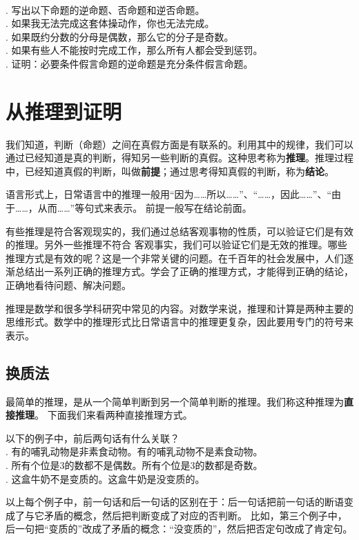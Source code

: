 \begin{xt}\label{xt:2-2-1}
    \mbox{} \\
    . 写出以下命题的逆命题、否命题和逆否命题。\\
    .  如果我无法完成这套体操动作，你也无法完成。\\
    . 如果既约分数的分母是偶数，那么它的分子是奇数。\\
    . 如果有些人不能按时完成工作，那么所有人都会受到惩罚。\\
    . 证明：必要条件假言命题的逆命题是充分条件假言命题。
\end{xt}

\chapter{从推理到证明}  %

我们知道，判断（命题）之间在真假方面是有联系的。利用其中的规律，我们可以通过已经知道是真的判断，得知另一些判断的真假。这种思考称为\textbf{推理}。推理过程中，已经知道真假的判断，叫做\textbf{前提}；通过思考得知真假的判断，称为\textbf{结论}。

语言形式上，日常语言中的推理一般用“因为……所以……”、“……，因此……”、“由于……，从而……”等句式来表示。
前提一般写在结论前面。

有些推理是符合客观现实的，我们通过总结客观事物的性质，可以验证它们是有效的推理。另外一些推理不符合
客观事实，我们可以验证它们是无效的推理。哪些推理方式是有效的呢？这是一个非常关键的问题。在千百年的社会发展中，人们逐渐总结出一系列正确的推理方式。学会了正确的推理方式，才能得到正确的结论，正确地看待问题、解决问题。

推理是数学和很多学科研究中常见的内容。对数学来说，推理和计算是两种主要的思维形式。数学中的推理形式比日常语言中的推理更复杂，因此要用专门的符号来表示。

\section{换质法}

最简单的推理，是从一个简单判断到另一个简单判断的推理。我们称这种推理为\textbf{直接推理}。
下面我们来看两种直接推理方式。

\begin{et}\label{et:2b-0-0} 
    以下的例子中，前后两句话有什么关联？\\
    . 有的哺乳动物是非素食动物。有的哺乳动物不是素食动物。\\
    . 所有个位是$3$的数都不是偶数。所有个位是$3$的数都是奇数。\\
    . 这盒牛奶不是变质的。这盒牛奶是没变质的。
\end{et}
以上每个例子中，前一句话和后一句话的区别在于：后一句话把前一句话的断语变成了与它矛盾的概念，然后把判断变成了对应的否判断。
比如，第三个例子中，后一句把“变质的”改成了矛盾的概念：“没变质的”，然后把否定句改成了肯定句。

